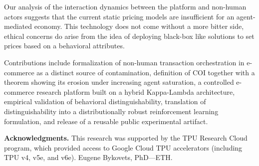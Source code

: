 \documentclass[10pt,letterpaper]{article}
\begin{document}
\vspace{0.5em}
Our analysis of the interaction dynamics between the platform and non-human actors suggests that the current static pricing models are insufficient for an agent-mediated economy.
This technology does not come without a more bitter side, ethical concerns do arise from the idea of deploying black-box like solutions to set prices based on a behavioral attributes.

\vspace{0.5em}
Contributions include formalization of non-human transaction orchestration in e-commerce as a distinct source of contamination, definition of COI together with a theorem showing its erosion under increasing agent saturation, a controlled e-commerce research platform built on a hybrid Kappa-Lambda architecture, empirical validation of behavioral distinguishability, translation of distinguishability into a distributionally robust reinforcement learning formulation, and release of a reusable public experimental artifact.

\vspace{0.65em}
\noindent\textbf{Acknowledgments.}\quad
This research was supported by the TPU Research Cloud program, which provided access to Google Cloud TPU accelerators (including TPU v4, v5e, and v6e).
Eugene Bykovets, PhD---ETH.

\renewcommand*{\bibfont}{\footnotesize}
\printbibliography[title={References}]
\end{document}
